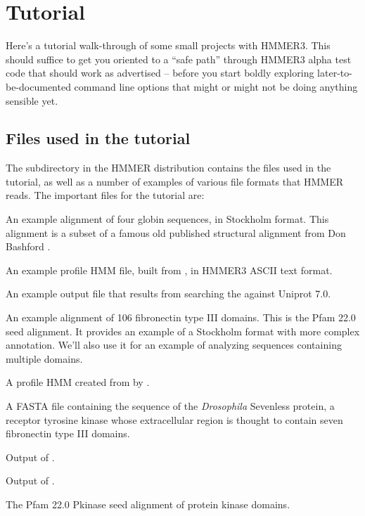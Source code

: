 
\section{Tutorial}
\label{section:tutorial}

Here's a tutorial walk-through of some small projects with
HMMER3. This should suffice to get you oriented to a ``safe path''
through HMMER3 alpha test code that should work as advertised -- before
you start boldly exploring later-to-be-documented command line options
that might or might not be doing anything sensible yet.


\subsection{Files used in the tutorial}

The subdirectory  in the HMMER distribution contains the
files used in the tutorial, as well as a number of examples of various
file formats that HMMER reads. The important files for the tutorial
are:


\begin{wideitem}
\item[\emprog{globins4.sto}] An example alignment of four globin sequences, in
  Stockholm format. This alignment is a subset of a famous old
  published structural alignment from Don Bashford \citep{Bashford87}.
%
\item[\emprog{globins4.hmm}] An example profile HMM file, built from
  , in HMMER3 ASCII text format.
%
\item[\emprog{globins4.out}] An example  output file that results
  from searching the  against Uniprot 7.0.
%
\item[\emprog{fn3.sto}] An example alignment of 106 fibronectin type III
  domains. This is the Pfam 22.0  seed alignment. It provides an
  example of a Stockholm format with more complex annotation. We'll also use
  it for an example of  analyzing sequences containing multiple
  domains.
%
\item[\emprog{fn3.hmm}] A profile HMM created from  by
  .
%
\item[\emprog{7LESS\_DROME}] A FASTA file containing the sequence of
  the \emph{Drosophila} Sevenless protein, a receptor tyrosine kinase
  whose extracellular region is thought to contain seven fibronectin
  type III domains. 
%
\item[\emprog{fn3.out}] Output of .
%
\item[\emprog{fn3.out}] Output of .
%
\item[\emprog{Pkinase.sto}] The Pfam 22.0 {Pkinase} seed alignment of
  protein kinase domains.
\end{wideitem}



